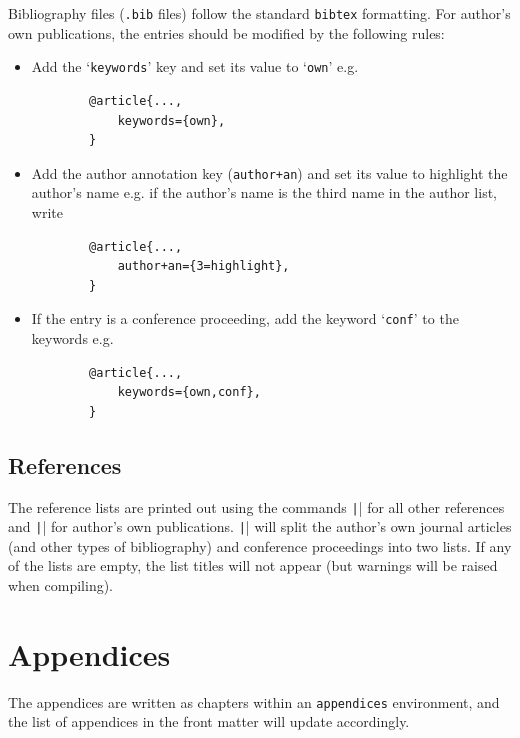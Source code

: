 \documentclass{umalayathesis}
\begin{document}
Bibliography files (\texttt{.bib} files) follow the standard \texttt{bibtex} formatting. For author's own publications, the entries should be modified by the following rules:
\begin{itemize}
    \item Add the `\texttt{keywords}' key and set its value to `\texttt{own}' e.g.
    \begin{verbatim}
        @article{...,
            keywords={own},
        }
    \end{verbatim}
    \item Add the author annotation key (\texttt{author+an}) and set its value to highlight the author's name e.g. if the author's name is the third name in the author list, write 
    \begin{verbatim}
        @article{...,
            author+an={3=highlight},
        }
    \end{verbatim}
    \item If the entry is a conference proceeding, add the keyword `\texttt{conf}' to the keywords e.g.
    \begin{verbatim}
        @article{...,
            keywords={own,conf},
        }
    \end{verbatim}
\end{itemize}

\subsection{References}

The reference lists are printed out using the commands \texttt|| for all other references and \texttt|\ownreferences| for author's own publications. \texttt|\ownreferences| will split the author's own journal articles (and other types of bibliography) and conference proceedings into two lists. If any of the lists are empty, the list titles will not appear (but warnings will be raised when compiling).

\section{Appendices}

The appendices are written as chapters within an \texttt{appendices} environment, and the list of appendices in the front matter will update accordingly. 

\nocite{*}
\ownreferences
\end{document}
